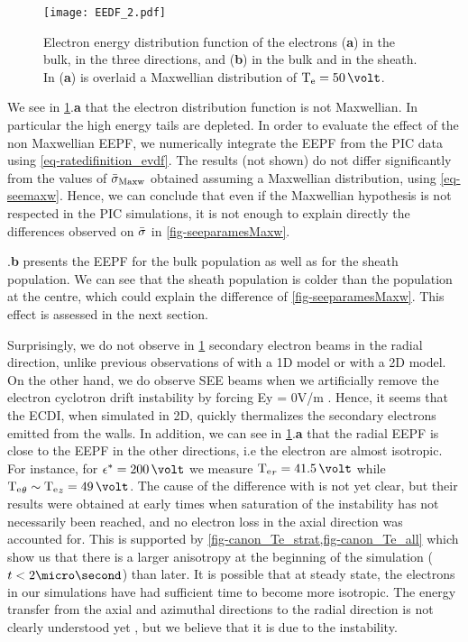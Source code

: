      \begin{figure}[hbtp]
       \centering
       \texttt{[image: EEDF\_2.pdf]}
       \caption{Electron energy distribution function of the electrons ({\bf a}) in the bulk, in the three directions, and ({\bf b}) in the bulk and in the sheath. In ({\bf a}) is overlaid a Maxwellian distribution of $\Te=50\,\volt$. }
       \label{fig-EEDF}
     \end{figure}
     
    We see in \cref{fig-EEDF}.{\bf a} that the electron distribution function is not Maxwellian.
    In particular the high energy tails are depleted.
    In order to evaluate the effect of the non Maxwellian EEPF, we numerically integrate the EEPF from the PIC data using \cref{eq-ratedifinition_evdf}.
    The results (not shown) do not differ significantly from the values of $ \bar{\sigma }_{\rm Maxw}$ obtained assuming a Maxwellian distribution, using \cref{eq-seemaxw}.
    Hence, we can conclude that even if the Maxwellian hypothesis is not respected in the PIC simulations, it is not enough to explain directly the differences observed on $ \bar{\sigma }$ in \cref{fig-seeparamesMaxw}.


    .{\bf b} presents the EEPF for the bulk population as well as for the sheath population.
    We can see that the sheath population is colder than the population at the centre, which could explain the difference of \cref{fig-seeparamesMaxw}. 
    This effect is assessed in the next section.

     Surprisingly, we do not observe in \cref{fig-EEDF} secondary electron beams in the radial  direction, unlike previous observations of \citet{sydorenko2006} with a 1D model or \citet{heron2013} with a 2D model.
     On the other hand, we do observe SEE beams when  we artificially remove the electron cyclotron drift instability by forcing Ey = 0V/m \citep{croes2017}.
     Hence, it seems that the ECDI, when simulated in 2D, quickly thermalizes the secondary electrons emitted from the walls.
     In addition, we can see in \cref{fig-EEDF}.{\bf a} that the radial EEPF is close to the EEPF in the other directions, i.e the electron are almost isotropic.
     For instance, for $\crover = 200\,\volt$  we measure $\Te_r = 41.5\,\volt$ while $\Te_{\theta} \sim \Te_z = 49\,\volt$.
     The cause of the difference with \citet{heron2013} is not yet clear, but their results were  obtained at early times when saturation of the instability has not necessarily been reached, and no electron loss in  the axial direction was accounted for.
     This is supported by \cref{fig-canon_Te_strat,fig-canon_Te_all} which show us that there is a larger anisotropy at the beginning of the simulation ($t<2\micro\second$) than later.
     It is possible that at steady state, the electrons in our simulations have had sufficient time to become more isotropic.
     The energy transfer from the axial and azimuthal directions to the radial direction is not clearly understood
     yet \citep{janhunen2018}, but we believe that it is due to the instability.



